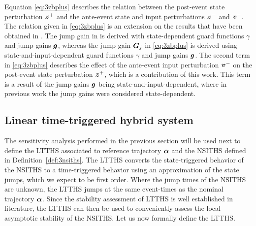 \documentclass[../DC2017114Bouma.tex]{subfiles}
\begin{document}
Equation \eqref{eq:3zbplus} describes the relation between the post-event state perturbation ${\boldsymbol{z}}^+$ and the ante-event state and input perturbations ${\boldsymbol{z}}^-$ and ${\boldsymbol{v}}^-$. The relation given in \eqref{eq:3zbplus} is an extension on the results that have been obtained in \cite{Rijnen2018}. The jump gain in \cite{Rijnen2018} is derived with state-dependent guard functions $\gamma$ and jump gains ${\boldsymbol{g}}$, whereas the jump gain ${\boldsymbol{G}}_j$ in \eqref{eq:3zbplus} is derived using state-and-input-dependent guard functions $\gamma$ and jump gains ${\boldsymbol{g}}$. The second term in \eqref{eq:3zbplus} describes the effect of the ante-event input perturbation ${\boldsymbol{v}}^-$ on the post-event state perturbation ${\boldsymbol{z}}^+$, which is a contribution of this work. This term is a result of the jump gains ${\boldsymbol{g}}$ being state-and-input-dependent, where in previous work the jump gains were considered state-dependent.

\subsection{Linear time-triggered hybrid system}
The sensitivity analysis performed in the previous section will be used next to define the LTTHS associated to reference trajectory $\boldsymbol{\alpha}$ and the NSITHS defined in Definition~\ref{def:3nsiths}. The LTTHS converts the state-triggered behavior of the NSITHS to a time-triggered behavior using an approximation of the state jumps, which we expect to be first order. Where the jump times of the NSITHS are unknown, the LTTHS jumps at the same event-times as the nominal trajectory $\boldsymbol{\alpha}$. Since the stability assessment of LTTHS is well established in literature, the LTTHS can then be used to conveniently assess the local asymptotic stability of the NSITHS. Let us now formally define the LTTHS.
\end{document}
